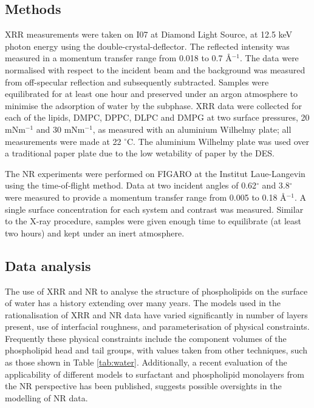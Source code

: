 \documentclass[twoside,twocolumn,9pt]{article}
\begin{document}
\subsection{Methods}
XRR measurements were taken on I07 at Diamond Light Source, at 12.5 keV photon energy using the double-crystal-deflector.\cite{Arnold2012} The reflected intensity was measured in a momentum transfer range from 0.018 to 0.7 \AA$^{-1}$. The data were normalised with respect to the incident beam and the background was measured from off-specular reflection and subsequently subtracted. Samples were equilibrated for at least one hour and preserved under an argon atmosphere to minimise the adsorption of water by the subphase. XRR data were collected for each of the lipids, DMPC, DPPC, DLPC and DMPG at two surface pressures, 20 mNm$^{-1}$ and 30 mNm$^{-1}$, as measured with an aluminium Wilhelmy plate; all measurements were made at 22 $^\circ$C. The aluminium Wilhelmy plate was used over a traditional paper plate due to the low wetability of paper by the DES. 

The NR experiments were performed on FIGARO at the Institut Laue-Langevin using the time-of-flight method.\cite{Campbell2011} Data at two incident angles of 0.62$^\circ$ and 3.8$^\circ$ were measured to provide a momentum transfer range from 0.005 to 0.18 \AA$^{-1}$. A single surface concentration for each system and contrast was measured. Similar to the X-ray procedure, samples were given enough time to equilibrate (at least two hours) and kept under an inert atmosphere.

\subsection{Data analysis}
The use of XRR and NR to analyse the structure of phospholipids on the surface of water has a history extending over many years.\cite{Mohwald1990,Kewalramani2010,Bayerl1990,Johnson1991,Clifton2012,Helm1987,Daillant1990} The models used in the rationalisation of XRR and NR data have varied significantly in number of layers present, use of interfacial roughness, and parameterisation of physical constraints. Frequently these physical constraints include the component volumes of the phospholipid head and tail groups, with values taken from other techniques, such as those shown in Table \ref{tab:water}. Additionally, a recent evaluation of the applicability of different models to surfactant and phospholipid monolayers from the NR perspective has been published,\cite{Campbell2018} suggests possible oversights in the modelling of NR data. 
\end{document}
